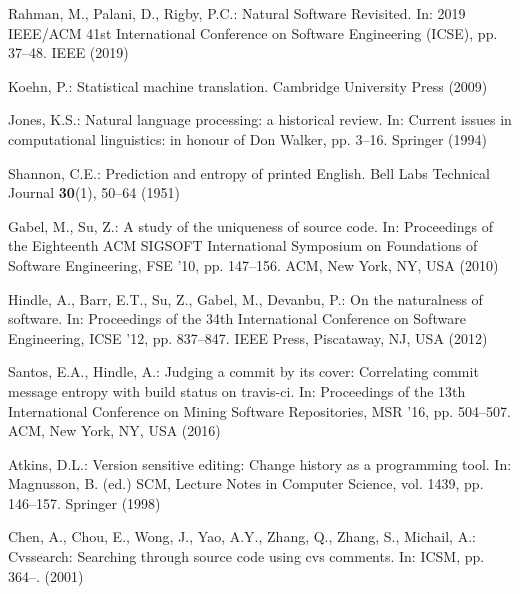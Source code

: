 \documentclass[runningheads]{llncs}
\begin{document}
%
%
% 

% 
%
\newpage
\begin{thebibliography}{8}
    Rahman, M., Palani, D., Rigby, P.C.: Natural Software Revisited. In: 2019 IEEE/ACM 41st International Conference on Software Engineering (ICSE), pp. 37--48. IEEE (2019)

    Koehn, P.: Statistical machine translation. Cambridge University Press (2009)
    
    Jones, K.S.: Natural language processing: a historical review. In: Current issues in computational linguistics: in honour of Don Walker, pp. 3--16. Springer (1994)
    
    Shannon, C.E.: Prediction and entropy of printed English. Bell Labs Technical Journal \textbf{30}(1), 50--64 (1951)
    
    Gabel, M., Su, Z.: A study of the uniqueness of source code. In: Proceedings of the Eighteenth ACM SIGSOFT International Symposium on Foundations of Software Engineering, FSE ’10, pp. 147--156. ACM, New York, NY, USA (2010)
    
    Hindle, A., Barr, E.T., Su, Z., Gabel, M., Devanbu, P.: On the naturalness of software. In: Proceedings of the 34th International Conference on Software Engineering, ICSE ’12, pp. 837--847. IEEE Press, Piscataway, NJ, USA (2012)
    
    Santos, E.A., Hindle, A.: Judging a commit by its cover: Correlating commit message entropy with build status on travis-ci. In: Proceedings of the 13th International Conference on Mining Software Repositories, MSR ’16, pp. 504--507. ACM, New York, NY, USA (2016)
    
    Atkins, D.L.: Version sensitive editing: Change history as a programming tool. In: Magnusson, B. (ed.) SCM, Lecture Notes in Computer Science, vol. 1439, pp. 146--157. Springer (1998)
    
    Chen, A., Chou, E., Wong, J., Yao, A.Y., Zhang, Q., Zhang, S., Michail, A.: Cvssearch: Searching through source code using cvs comments. In: ICSM, pp. 364--. (2001)
    

\end{thebibliography}
\end{document}
